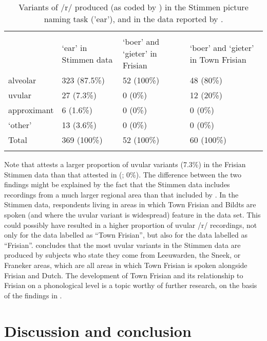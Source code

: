 \documentclass[output=paper,hidelinks]{langscibook}
\begin{document}
\begin{table}
	\caption{Variants of /r/ produced (as coded by \citealt{Bakker2018}) in the Stimmen picture naming task ('ear'), and in the data reported by \citet{Bezooijen2009}.}
	\label{tab:hilton:4}
\begin{tabularx}{\textwidth}{l@{}YYY}
\lsptoprule 
& \citet{Bakker2018} & \mbox{\citet{Bezooijen2009}} & \mbox{\citet{Bezooijen2009}} \\
& ‘ear’ in Stimmen data & `boer' and `gieter' in Frisian & `boer' and `gieter' in Town Frisian \\
\midrule 
{alveolar} & 323 (87.5\%) & 52 (100\%) & 48 (80\%) \\
{uvular} & 27 (7.3\%) & 0 (0\%) & 12 (20\%) \\
{approximant} & 6 (1.6\%) & 0 (0\%) & 0 (0\%) \\
{‘other'} & 13 (3.6\%) & 0 (0\%) & 0 (0\%) \\
\midrule 
{Total} & 369 (100\%) & 52 (100\%) & 60 (100\%)\\
\lspbottomrule 
\end{tabularx}
\end{table}



Note that \citet{Bakker2018} attests a larger proportion of uvular variants (7.3\%) in the Frisian Stimmen data than that attested in \citeauthor{Bezooijen2009} (\citeyear{Bezooijen2009}; 0\%). The difference between the two findings might be explained by the fact that the Stimmen data includes recordings from a much larger regional area than that included by \citet{Bezooijen2009}. In the Stimmen data, respondents living in areas in which Town Frisian and Bildts are spoken (and where the uvular variant is widespread) feature in the data set. This could possibly have resulted in a higher proportion of uvular /r/ recordings, not only for the data labelled as “Town Frisian”, but also for the data labelled as “Frisian”. \citet{Bakker2018} concludes that the most uvular variants in the Stimmen data are produced by subjects who state they come from Leeuwarden, the Sneek, or Franeker areas, which are all areas in which Town Frisian is spoken alongside Frisian and Dutch. The development of Town Frisian and its relationship to Frisian on a phonological level is a topic worthy of further research, on the basis of the findings in \citet{Bakker2018}.

\section{Discussion and conclusion}
\end{document}
